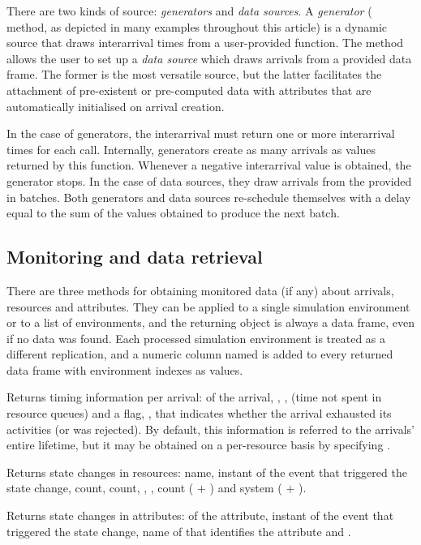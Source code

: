 \documentclass[
  nojss]{jss}
\providecommand{\tightlist}{%
  \setlength{\itemsep}{0pt}\setlength{\parskip}{0pt}}
\begin{document}
There are two kinds of source: \emph{generators} and \emph{data
sources}. A \emph{generator} ( method, as depicted
in many examples throughout this article) is a dynamic source that draws
interarrival times from a user-provided function. The
 method allows the user to set up a \emph{data
source} which draws arrivals from a provided data frame. The former is
the most versatile source, but the latter facilitates the attachment of
pre-existent or pre-computed data with attributes that are automatically
initialised on arrival creation.

In the case of generators, the interarrival  must
return one or more interarrival times for each call. Internally,
generators create as many arrivals as values returned by this function.
Whenever a negative interarrival value is obtained, the generator stops.
In the case of data sources, they draw arrivals from the 
provided in batches. Both generators and data sources re-schedule
themselves with a delay equal to the sum of the values obtained to
produce the next batch.

\hypertarget{monitoring-and-data-retrieval}{%
\subsection{Monitoring and data
retrieval}\label{monitoring-and-data-retrieval}}

There are three methods for obtaining monitored data (if any) about
arrivals, resources and attributes. They can be applied to a single
simulation environment or to a list of environments, and the returning
object is always a data frame, even if no data was found. Each processed
simulation environment is treated as a different replication, and a
numeric column named  is added to every returned data
frame with environment indexes as values.

\begin{description}
\tightlist
\item[get\_mon\_arrivals()]
Returns timing information per arrival:  of the arrival,
, ,  (time not spent
in resource queues) and a flag, , that indicates whether
the arrival exhausted its activities (or was rejected). By default, this
information is referred to the arrivals' entire lifetime, but it may be
obtained on a per-resource basis by specifying .
\item[get\_mon\_resources()]
Returns state changes in resources:  name, 
instant of the event that triggered the state change, 
count,  count, , ,
 count ( \(+\) ) and system
 ( \(+\) ).
\item[get\_mon\_attributes()]
Returns state changes in attributes:  of the attribute,
 instant of the event that triggered the state change, name
of  that identifies the attribute and .
\end{description}
\end{document}
